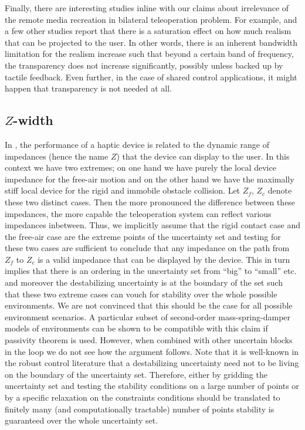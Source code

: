 Finally, there are interesting studies inline with our claims about irrelevance of the remote media recreation in bilateral
teleoperation problem. For example, \cite{kilchenman,wildenbeest,boessenkool} and a few other studies report that there is a saturation
effect on how much realism that can be projected to the user. In other words, there is an inherent bandwidth limitation for 
the realism increase such that beyond a certain band of frequency, the transparency does not increase significantly, possibly
unless backed up by tactile feedback. Even further, in the case of shared control applications, it might happen that transparency 
is not needed at all. 



\subsection{\texorpdfstring{$Z$}{Z}-width}

In \cite{colgate4}, the performance of a haptic device is related to the dynamic range of impedances (hence the name $Z$) that
the device can display to the user. In this context we have two extremes; on one hand we have purely the local device impedance 
for the free-air motion and on the other hand we have the maximally stiff local device for the rigid and immobile obstacle collision. 
Let $Z_f$, $Z_c$ denote these two distinct cases. Then the more pronounced the difference between these impedances, the more 
capable the teleoperation system can reflect various impedances inbetween. Thus, we implicitly assume that the rigid contact 
case and the free-air case are the extreme points of the uncertainty set and testing for these two cases are sufficient to 
conclude that any impedance on the path from $Z_f$ to $Z_c$ is a valid impedance that can be displayed by the device. This
in turn implies that there is an ordering in the uncertainty set from \enquote{big} to \enquote{small} etc. and moreover 
the destabilizing uncertainty is at the boundary of the set such that these two extreme cases can vouch for stability over 
the whole possible environments. We are not convinced that this should be the case for all possible environment 
scenarios. A particular subset of second-order mass-spring-damper models of environments can be shown to be compatible 
with this claim if passivity theorem is used. However, when combined with other uncertain blocks in the loop we do not see
how the argument follows. Note that it is well-known in the robust control literature that a destabilizing uncertainty need
not to be living on the boundary of the uncertainty set. Therefore, either by gridding the uncertainty set and testing the 
stability conditions on a large number of points or by a specific relaxation on the constraints conditions should be 
translated to finitely many (and computationally tractable) number of points stability is guaranteed over the whole 
uncertainty set.

